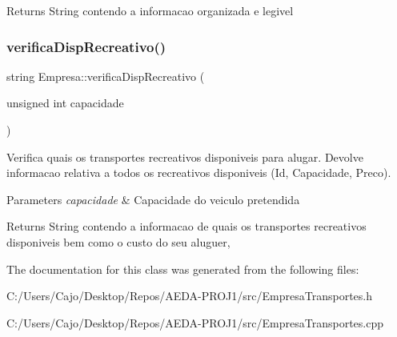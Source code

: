 \begin{DoxyReturn}{Returns}
String contendo a informacao organizada e legivel 
\end{DoxyReturn}
\mbox{\label{class_empresa_a36bb8eb5b7825df35e30164fd74e508e}} 
\subsubsection{\texorpdfstring{verifica\+Disp\+Recreativo()}{verificaDispRecreativo()}}
{\footnotesize\ttfamily string Empresa\+::verifica\+Disp\+Recreativo (\begin{DoxyParamCaption}\item[{unsigned int}]{capacidade }\end{DoxyParamCaption})}



Verifica quais os transportes recreativos disponiveis para alugar. Devolve informacao relativa a todos os recreativos disponiveis (Id, Capacidade, Preco). 


\begin{DoxyParams}{Parameters}
{\em capacidade} & Capacidade do veiculo pretendida\\
\hline
\end{DoxyParams}
\begin{DoxyReturn}{Returns}
String contendo a informacao de quais os transportes recreativos disponiveis bem como o custo do seu aluguer, 
\end{DoxyReturn}


The documentation for this class was generated from the following files\+:\begin{DoxyCompactItemize}
\item 
C\+:/\+Users/\+Cajo/\+Desktop/\+Repos/\+A\+E\+D\+A-\/\+P\+R\+O\+J1/src/Empresa\+Transportes.\+h\item 
C\+:/\+Users/\+Cajo/\+Desktop/\+Repos/\+A\+E\+D\+A-\/\+P\+R\+O\+J1/src/Empresa\+Transportes.\+cpp\end{DoxyCompactItemize}
